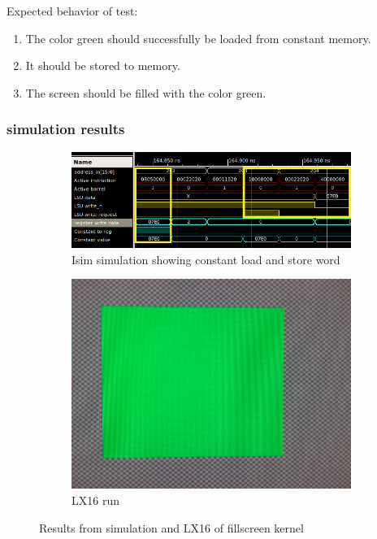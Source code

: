 \documentclass[../main/report.tex]{subfiles}
\begin{document}
Expected behavior of test:
\begin{enumerate}
  \item
    The color green should successfully be loaded from constant memory.
  \item
    It should be stored to memory.
  \item
    The screen should be filled with the color green.
\end{enumerate}

\subsubsection*{simulation results}

\begin{figure}[H]
  \centering
  \begin{subfigure}[b]{\textwidth}
    \includegraphics[width=\textwidth]{../testing/assets/Constant_load_&_store.png}
    \caption{Isim simulation showing constant load and store word}
    \label{fig:isim-kernel-parameterization}
  \end{subfigure}
  \begin{subfigure}[b]{0.3\textwidth}
    \includegraphics[width=\textwidth]{../testing/assets/green_screen.jpg}
    \caption{LX16 run}
    \label{fig:LX16-kernel-parameterization}
  \end{subfigure}
  \caption{Results from simulation and LX16 of fillscreen kernel}
\end{figure}
\end{document}
